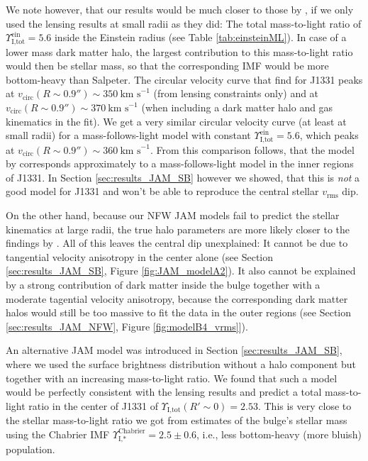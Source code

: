 We note however, that our results would be much closer to those by \citet{SWELLSV}, if we only used the lensing results at small radii as they did: The total mass-to-light ratio of $\Upsilon_\text{I,tot}^\text{ein} = 5.6$ inside the Einstein radius (see Table \ref{tab:einsteinML}). In case of a lower mass dark matter halo, the largest contribution to this mass-to-light ratio would then be stellar mass, so that the corresponding IMF would be more bottom-heavy than Salpeter. The circular velocity curve that \citet{SWELLSV} find for J1331 peaks at $v_\text{circ}(R\sim0.9'') \sim 350~\text{km s}^{-1}$ (from lensing constraints only) and at $v_\text{circ}(R\sim0.9'') \sim 370~\text{km s}^{-1}$ (when including a dark matter halo and gas kinematics in the fit). We get a very similar circular velocity curve (at least at small radii) for a mass-follows-light model with constant $\Upsilon_\text{I,tot}^\text{ein} = 5.6$, which peaks at $v_\text{circ}(R\sim0.9'') \sim 360~\text{km s}^{-1}$. From this comparison follows, that the model by \citet{SWELLSV} corresponds approximately to a mass-follows-light model in the inner regions of J1331. In Section \ref{sec:results_JAM_SB} however we showed, that this is \emph{not} a good model for J1331 and won't be able to reproduce the central stellar $v_\text{rms}$ dip. 

On the other hand, because our NFW JAM models fail to predict the stellar kinematics at large radii, the true halo parameters are more likely closer to the findings by \citet{SWELLSV}. All of this leaves the central dip unexplained: It cannot be due to tangential velocity anisotropy in the center alone (see Section \ref{sec:results_JAM_SB}, Figure \ref{fig:JAM_modelA2}). It also cannot be explained by a strong contribution of dark matter inside the bulge together with a moderate tagential velocity anisotropy, because the corresponding dark matter halos would still be too massive to fit the data in the outer regions (see Section \ref{sec:results_JAM_NFW}, Figure \ref{fig:modelB4_vrms}]).

An alternative JAM model was introduced in Section \ref{sec:results_JAM_SB}, where we used the surface brightness distribution without a halo component but together with an increasing mass-to-light ratio. We found that such a model would be perfectly consistent with the lensing results and predict a total mass-to-light ratio in the center of J1331 of  $\Upsilon_\text{I,tot}(R'\sim0) = 2.53$. This is very close to the stellar mass-to-light ratio we got from \citet{SWELLSI} estimates of the bulge's stellar mass using the Chabrier IMF $\Upsilon_\text{I,*}^\text{Chabrier} = 2.5 \pm 0.6$, i.e., less bottom-heavy (more bluish) population.

